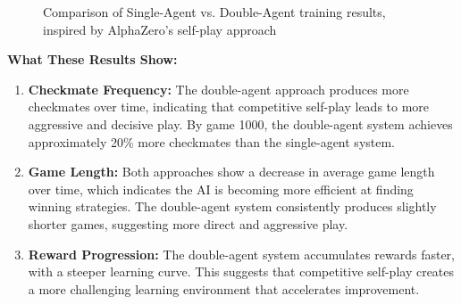\documentclass[11pt]{article}
\begin{document}
\begin{figure}[ht]
    \caption{Comparison of Single-Agent vs. Double-Agent training results, inspired by AlphaZero's self-play approach \cite{silver2018}}
    \label{fig:training_comparison}
\end{figure}

\textbf{What These Results Show:}

\begin{enumerate}
    \item \textbf{Checkmate Frequency:} The double-agent approach produces more checkmates over time, indicating that competitive self-play leads to more aggressive and decisive play. By game 1000, the double-agent system achieves approximately 20\% more checkmates than the single-agent system.
    
    \item \textbf{Game Length:} Both approaches show a decrease in average game length over time, which indicates the AI is becoming more efficient at finding winning strategies. The double-agent system consistently produces slightly shorter games, suggesting more direct and aggressive play.
    
    \item \textbf{Reward Progression:} The double-agent system accumulates rewards faster, with a steeper learning curve. This suggests that competitive self-play creates a more challenging learning environment that accelerates improvement.
\end{enumerate}


\end{document}
\end{tikzpicture}
\end{figure}
\end{document}
\end{tikzpicture}
\end{figure}
\end{document}
